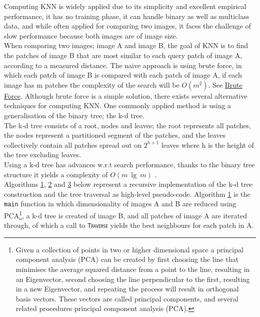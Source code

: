 Computing KNN is widely applied due to its simplicity and excellent empirical performance, it has no training phase, it can handle binary as well as multiclass data, and while often applied for comparing two images, it faces the challenge of slow performance because both images are of image size. 
\\[2mm]
When comparing two images; image A and image B, the goal of KNN is to find the patches of image B that are most similar to each query patch of image A, according to a measured distance. The naive approach is using brute force, in which each patch of image B is compared with each patch of image A, if each image has m patches the complexity of the search will be $O(m^2)$. See \hyperref[sec:brute]{Brute Force}. Although brute force is a simple solution, there exists several alternative techniques for computing KNN. One commonly applied method is using a generalisation of the binary tree; the k-d tree. 
\\[2mm]
The k-d tree consists of a root, nodes and leaves; the root represents all patches, the nodes represent a partitioned segment of the patches, and the leaves collectively contain all patches spread out on $2^{h+1}$ leaves where h is the height of the tree excluding leaves.
\\[2mm]
Using a k-d tree has advances w.r.t search performance, thanks to the binary tree structure it yields a complexity of $O(m\ \lg\ m)$ \cite{logmatches}.
\\[2mm]
Algorithms \hyperref[alg:main]{1}, \hyperref[alg:tree]{2} and \hyperref[alg:traverse]{3} below represent a recursive implementation of the k-d tree construction and the tree traversal as high-level pseudo-code. 
Algorithm \hyperref[alg:main]{1} is the \texttt{main} function in which dimensionality of images A and B are reduced using PCA\footnote{Given a collection of points in two or higher dimensional space a principal component analysis (PCA) can be created by first choosing the line that minimises the average squared distance from a point to the line, resulting in an Eigenvector, second choosing the line perpendicular to the first, resulting in a new Eigenvector, and repeating the process will result in orthogonal basis vectors. These vectors are called principal components, and several related procedures principal component analysis (PCA).}, a k-d tree is created of image B, and all patches of image A are iterated through, of which a call to \texttt{\textsc{Traverse}} yields the best neighbours for each patch in A. 


